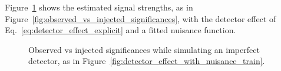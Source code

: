 \documentclass[paper/ddppaper2.tex]{subfiles}
\begin{document}
Figure~\ref{fig:detector_affected_significances} shows the estimated signal strengths, as in Figure~\ref{fig:observed_vs_injected_significances}, with the detector effect of Eq.~\ref{eq:detector_effect_explicit} and a fitted nuisance function.

\begin{figure}
    \caption{Observed vs injected significances while simulating an imperfect detector, as in Figure~\ref{fig:detector_effect_with_nuisance_train}.}
    \label{fig:detector_affected_significances}
\end{figure}
\end{document}
